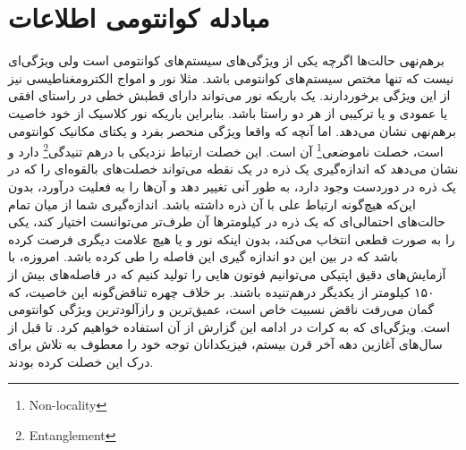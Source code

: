 \section{مبادله کوانتومی اطلاعات}
برهم‌نهی حالت‌ها اگرچه یکی از ویژگی‌های سیستم‌های کوانتومی است ولی ویژگی‌ای نیست که تنها مختص سیستم‌های کوانتومی باشد. مثلا
نور و امواج الکترومغناطیسی نیز از این ویژگی برخوردارند. یک باریکه نور می‌تواند دارای قطبش خطی در راستای افقی یا عمودی و یا ترکیبی
از هر دو راستا باشد. بنابراین باریکه نور کلاسیک از خود خاصیت برهم‌نهی نشان می‌دهد. اما آنچه که واقعا ویژگی منحصر بفرد و یکتای
مکانیک کوانتومی است، خصلت ناموضعی\footnote{Non-locality} آن است. این خصلت ارتباط نزدیکی با درهم تنیدگی\footnote{Entanglement} دارد و نشان می‌دهد که اندازه‌گیری یک
ذره در یک نقطه می‌تواند خصلت‌های بالقوه‌ای را که در یک ذره در دوردست وجود دارد، به طور آنی تغییر دهد و آن‌ها را به فعلیت درآورد، بدون
این‌که هیچ‌گونه ارتباط علی با آن ذره داشته باشد. اندازه‌گیری شما از میان تمام حالت‌های احتمالی‌ای که یک ذره در کیلومترها آن طرف‌تر می‌توانست اختیار کند، یکی را به
صورت قطعی انتخاب می‌کند، بدون اینکه نور و یا هیچ علامت دیگری فرصت کرده باشد که در بین این دو اندازه گیری این فاصله را طی کرده
باشد. امروزه، با آزمایش‌های دقیق اپتیکی می‌توانیم فوتون هایی را تولید کنیم که در فاصله‌های بیش از ١۵٠ کیلومتر از یکدیگر درهم‌تنیده باشند.  بر خلاف چهره تناقض‌گونه این خاصیت، که گمان می‌رفت ناقض نسبیت خاص است، عمیق‌ترین و رازآلودترین ویژگی کوانتومی است. ویژگی‌ای که به کرات در ادامه این گزارش از آن استفاده خواهیم کرد. تا قبل از سال‌های آغازین دهه آخر قرن بیستم، فیزیکدانان توجه خود را معطوف به تلاش برای درک این خصلت کرده بودند. 

